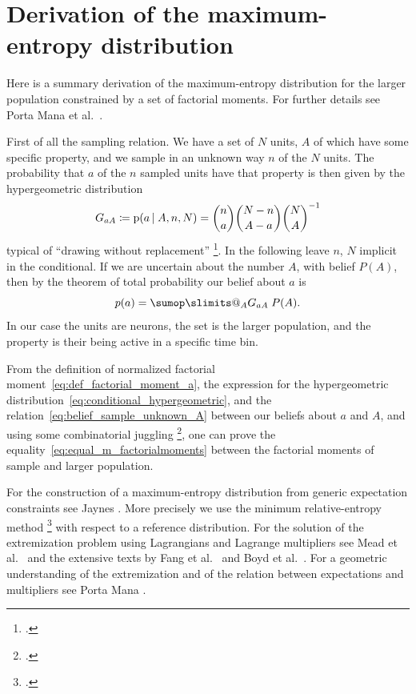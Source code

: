 \documentclass[\ifafour a4paper,12pt,\else a5paper,10pt,\fi%
onecolumn,oneside,article,%
british%
]{memoir}
\makeatletter
\theoremstyle{remark}
\theoremstyle{innote}
\def\sum{\DOTSI\sumop\slimits@}
\newcommand*{\citep}{\footcites}
\newcommand*{\citey}{\parencites*}
\newcommand*{\defd}{\coloneqq}
\newcommand*{\pf}{\mathrm{p}}%
\renewcommand*{\|}{\nonscript\,\vert\nonscript\;\mathopen{}}
\newcommand*{\sect}{\S}%
\newcommand*{\sects}{\S\S}%
\newcommand*{\chap}{ch.}%
\newcommand*{\chaps}{chs}%
\newcommand*{\etal}{{et al.}}
\newcommand*{\yG}{G}
\newcommand*{\yAv}{A}
\newcommand*{\yav}{a}
\newcommand*{\ya}{\yav}%
\newcommand*{\yA}{\yAv}%
\makeatother
\begin{document}
\section{Derivation of the maximum-entropy distribution}
\label{sec:derivation_maxent_fullnet}

Here is a summary derivation of the maximum-entropy distribution for the
larger population constrained by a set of factorial moments. For further details
see Porta Mana \etal\ \citey{portamanaetal2015}.

\bigskip

First of all the sampling relation. We have a set of $N$ units, $\yA$ of
which have some specific property, and we sample in an unknown way $n$ of
the $N$ units. The probability that $\ya$ of the $n$ sampled units have that
property is then given by the hypergeometric distribution
\begin{equation}
  \label{eq:conditional_hypergeometric}
  \yG_{\ya\yA} \defd \pf(\ya \|\yA, n,N)=
  \binom{n}{\ya}\binom{N-n}{\yA-\ya}\binom{N}{\yA}^{-1}
\end{equation}
typical of \enquote{drawing without replacement}
\citep[\chap~3]{jaynes1994_r2003}[\sect~4.8.3]{ross1976_r2010}[\sect~II.6]{feller1950_r1968}[\sects~2.1,
3.2]{jeffreys1939_r1983}.
In the following leave $n$, $N$ implicit in the conditional. If we are
uncertain about the number $\yA$, with belief $P(\yA)$, then by the theorem
of total probability our belief about $\ya$ is
\begin{equation}
  \label{eq:belief_sample_unknown_A}
  p(\ya)= \sum_{\yA} \yG_{\ya\yA} \;P(\yA).
\end{equation}
In our case the units are neurons, the set is the larger population, and the
property is their being active in a specific time bin.

From the definition of normalized factorial
moment~\eqref{eq:def_factorial_moment_a}, the expression for the
hypergeometric distribution~\eqref{eq:conditional_hypergeometric}, and the
relation~\eqref{eq:belief_sample_unknown_A} between our beliefs about $\ya$
and $\yA$, and using some combinatorial juggling
\citep[\chaps~I--IV]{whitworth1867_r1965}[\chap~II]{feller1950_r1968}[appendix~A]{portamanaetal2015}{potts1953}, one
can prove the equality~\eqref{eq:equal_m_factorialmoments} between the
factorial moments of sample and larger population.

\bigskip

For the construction of a maximum-entropy distribution from generic
expectation constraints see Jaynes
\citey{jaynes1963}[\chap~11]{jaynes1994_r2003}. More precisely we use the
minimum relative-entropy method
\citep{hobsonetal1973,csiszar1985}[\sect~5.2.2]{sivia1996_r2006} with
respect to a reference distribution. For the solution of the extremization
problem using Lagrangians and Lagrange multipliers see Mead \etal\
\citey{meadetal1984} and the extensive texts by Fang \etal\
\citey{fangetal1997} and Boyd \etal\ \citey{boydetal2004_r2009}. For a
geometric understanding of the extremization and of the relation between
expectations and multipliers see Porta Mana \citey{portamana2017b}.
\end{document}
